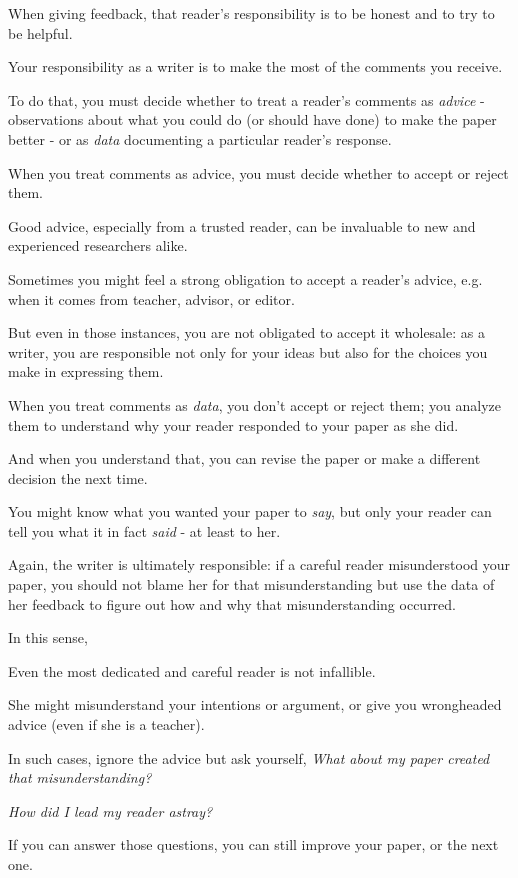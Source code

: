 \documentclass[oneside]{book}
\numberwithin{equation}{section}
\begin{document}
When giving feedback, that reader's responsibility is to be honest and to try to be helpful.

Your responsibility as a writer is to make the most of the comments you receive.

%
To do that, you must decide whether to treat a reader's comments as \textit{advice} - observations about what you could do (or should have done) to make the paper better - or as \textit{data} documenting a particular reader's response.

When you treat comments as advice, you must decide whether to accept or reject them.

Good advice, especially from a trusted reader, can be invaluable to new and experienced researchers alike.

Sometimes you might feel a strong obligation to accept a reader's advice, e.g. when it comes from teacher, advisor, or editor.

But even in those instances, you are not obligated to accept it wholesale: as a writer, you are responsible not only for your ideas but also for the choices you make in expressing them.

%
When you treat comments as \textit{data}, you don't accept or reject them; you analyze them to understand why your reader responded to your paper as she did.

And when you understand that, you can revise the paper or make a different decision the next time.

You might know what you wanted your paper to \textit{say}, but only your reader can tell you what it in fact \textit{said} - at least to her.

Again, the writer is ultimately responsible: if a careful reader misunderstood your paper, you should not blame her for that misunderstanding but use the data of her feedback to figure out how and why that misunderstanding occurred.

%
In this sense, 

Even the most dedicated and careful reader is not infallible.

She might misunderstand your intentions or argument, or give you wrongheaded advice (even if she is a teacher).

In such cases, ignore the advice but ask yourself, \textit{What about my paper created that misunderstanding?}

\textit{How did I lead my reader astray?}

If you can answer those questions, you can still improve your paper, or the next one.
\end{document}
